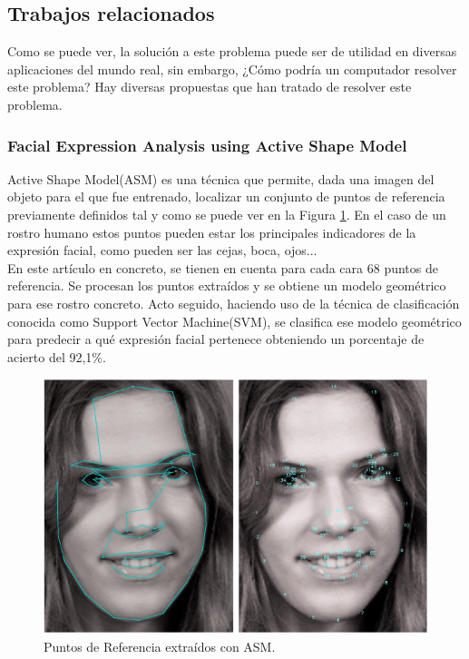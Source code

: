 \documentclass[a4paper,11pt]{book}
\begin{document}
\subsection{Trabajos relacionados}

Como se puede ver, la solución a este problema puede ser de utilidad en diversas aplicaciones del mundo real, sin embargo, ¿Cómo podría un computador resolver este problema? Hay diversas propuestas que han tratado de resolver este problema.

\subsubsection{Facial Expression Analysis using Active Shape Model\cite{shbib_zhou15}}

Active Shape Model(ASM)\cite{cootes_taylor_cooper_graham94} es una técnica que permite, dada una imagen del objeto para el que fue entrenado, localizar un conjunto de puntos de referencia previamente definidos tal y como se puede ver en la Figura \ref{fig:landmarks}. En el caso de un rostro humano estos puntos pueden estar los principales indicadores de la expresión facial, como pueden ser las cejas, boca, ojos...\\
En este artículo \cite{shbib_zhou15} en concreto, se tienen en cuenta para cada cara 68 puntos de referencia. Se procesan los puntos extraídos y se obtiene un modelo geométrico para ese rostro concreto. Acto seguido, haciendo uso de la técnica de clasificación conocida como Support Vector Machine(SVM), se clasifica ese modelo geométrico para predecir a qué expresión facial pertenece obteniendo un porcentaje de acierto del 92,1\%.

\begin{figure}[!]
\centering
\includegraphics[width=0.7\linewidth]{imagenes/landmarks}
\caption[Puntos de Referencia ASM]{Puntos de Referencia extraídos con ASM.}
\label{fig:landmarks}
\end{figure}
\end{document}
